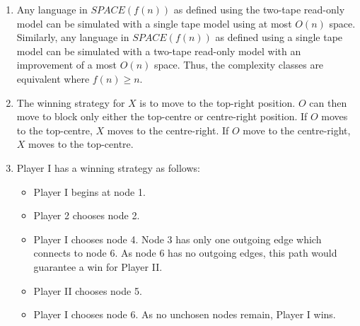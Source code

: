 \documentclass[11pt]{article}
\begin{document}
\begin{enumerate}[8.1]
  \item Any language in $SPACE(f(n))$ as defined using the two-tape read-only model can be simulated with a single tape model using at most $O(n)$ space. Similarly, any language in $SPACE(f(n))$ as defined using a single tape model can be simulated with a two-tape read-only model with an improvement of a most $O(n)$ space. Thus, the complexity classes are equivalent where $f(n) \geq n$. 
  \item The winning strategy for $X$ is to move to the top-right position. $O$ can then move to block only either the top-centre or centre-right position. If $O$ moves to the top-centre, $X$ moves to the centre-right. If $O$ move to the centre-right, $X$ moves to the top-centre.
  \item Player I has a winning strategy as follows:
  \begin{itemize}
    \item Player I begins at node 1.
    \item Player 2 chooses node 2.
    \item Player I chooses node 4. Node 3 has only one outgoing edge which connects to node 6. As node 6 has no outgoing edges, this path would guarantee a win for Player II. 
    \item Player II chooses node 5.
    \item Player I chooses node 6. As no unchosen nodes remain, Player I wins.
  \end{itemize}
\end{enumerate}   
\end{document}
